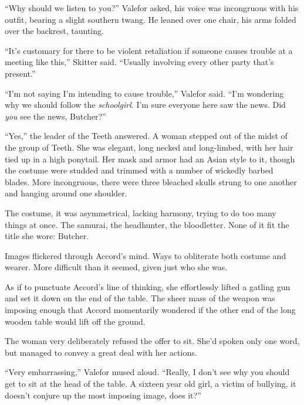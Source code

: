 ``Why should we listen to you?'' Valefor asked, his voice was incongruous with his outfit, bearing a slight southern twang.  He leaned over one chair, his arms folded over the backrest, taunting.



``It's customary for there to be violent retaliation if someone causes trouble at a meeting like this,'' Skitter said.  ``Usually involving every other party that's present.''



``I'm not saying I'm intending to cause trouble,'' Valefor said.  ``I'm wondering why we should follow the \emph{schoolgirl}.  I'm sure everyone here saw the news.  Did \emph{you} see the news, Butcher?''



``Yes,'' the leader of the Teeth answered.  A woman stepped out of the midst of the group of Teeth.  She was elegant, long necked and long-limbed, with her hair tied up in a high ponytail.  Her mask and armor had an Asian style to it, though the costume were studded and trimmed with a number of wickedly barbed blades.  More incongruous, there were three bleached skulls strung to one another and hanging around one shoulder.



The costume, it was asymmetrical, lacking harmony, trying to do too many things at once.  The samurai, the headhunter, the bloodletter.  None of it fit the title she wore: Butcher.



Images flickered through Accord's mind.  Ways to obliterate both costume and wearer. More difficult than it seemed, given just who she was.



As if to punctuate Accord's line of thinking, she effortlessly lifted a gatling gun and set it down on the end of the table.  The sheer mass of the weapon was imposing enough that Accord momentarily wondered if the other end of the long wooden table would lift off the ground.



The woman very deliberately refused the offer to sit.  She'd spoken only one word, but managed to convey a great deal with her actions.



``Very embarrassing,'' Valefor mused aloud.  ``Really, I don't see why you should get to sit at the head of the table.  A sixteen year old girl, a victim of bullying, it doesn't conjure up the most imposing image, does it?''



